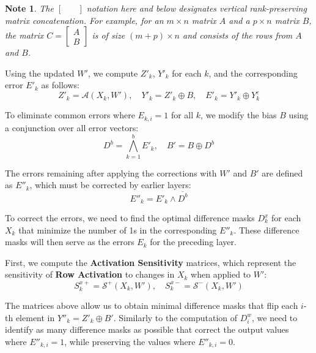 \documentclass[pmlr]{jmlr}
\newtheorem*{note}{Note}
\begin{document}
\begin{note}
    The \(\begin{bmatrix} \quad \end{bmatrix}\) notation here and below designates vertical rank-preserving matrix concatenation. For example, for an \( m \times n \) matrix \( A \) and a \( p \times n \) matrix \( B \), the matrix \( C = \begin{bmatrix} A \\ B \end{bmatrix} \) is of size \( (m+p) \times n \) and consists of the rows from \( A \) and \( B \).
\end{note}

Using the updated \( W' \), we compute \( Z'_k \), \( Y'_k \) for each \( k \), and the corresponding error \( E'_k \) as follows:
\[ Z'_k = \mathcal{A}(X_k, W'), \quad Y'_k = Z'_k \oplus B, \quad E'_k = Y'_k \oplus Y^e_k \]

To eliminate common errors where \( E_{k,i} = 1 \) for all \( k \), we modify the bias \( B \) using a conjunction over all error vectors:
\[ D^b = \bigwedge_{k=1}^b E'_k, \quad B' = B \oplus D^b \]

The errors remaining after applying the corrections with \( W' \) and \( B' \) are defined as \( E''_k \), which must be corrected by earlier layers:
\[ E''_k = E'_k \wedge \overline{D^b} \]

To correct the errors, we need to find the optimal difference masks \( D^x_k \) for each \( X_k \) that minimize the number of 1s in the corresponding \( E''_k \). These difference masks will then serve as the errors \( E_k \) for the preceding layer.

First, we compute the \textbf{Activation Sensitivity} matrices, which represent the sensitivity of \textbf{Row Activation} to changes in \( X_k \) when applied to \( W' \):
\[ S^{x+}_k = \mathcal{S^+}(X_k, W'), \quad S^{x-}_k = \mathcal{S^-}(X_k, W') \]

The matrices above allow us to obtain minimal difference masks that flip each \( i \)-th element in \( Y''_k = Z'_k \oplus B' \). Similarly to the computation of \( D^w_i \), we need to identify as many difference masks as possible that correct the output values where \( E''_{k,i} = 1 \), while preserving the values where \( E''_{k,i} = 0 \).
\end{document}
